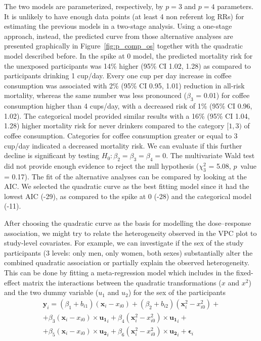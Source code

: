 \documentclass[11pt,a4paper,twoside,openany]{book}\usepackage{knitr}
\begin{document}
{{\noindent The two models are parameterized, respectively, by $p = 3$ and $p = 4$ parameters. It is unlikely to have enough data points (at least 4 non referent log RRs) for estimating the previous models in a two-stage analysis. Using a one-stage approach, instead, the predicted curve from those alternative analyses are presented graphically in Figure~\ref{fig:p_comp_os} together with the quadratic model described before. 
In the spike at 0 model, the predicted mortality risk for the unexposed participants was 14\% higher (95\% CI 1.02, 1.28) as compared to participants drinking 1 cup/day. Every one cup per day increase in coffee consumption was associated with 2\% (95\% CI 0.95, 1.01) reduction in all-risk mortality, whereas the same number was less pronounced ($\beta_3$ = 0.01) for coffee consumption higher than 4 cups/day, with a decreased risk of 1\% (95\% CI 0.96, 1.02). 
The categorical model provided similar results with a 16\% (95\% CI 1.04, 1.28) higher mortality risk for never drinkers compared to the category $[1, 3)$ of coffee consumption. Categories for coffee consumption greater or equal to 3 cup/day indicated a decreased mortality risk. We can evaluate if this further decline is significant by testing $H_0: \beta_2 = \beta_3 = \beta_4 = 0$. The multivariate Wald test did not provide enough evidence to reject the null hypothesis ($\chi_3^2$ = 5.08, $p$~value = 0.17).
The fit of the alternative analyses can be compared by looking at the AIC. We selected the quadratic curve as the best fitting model since it had the lowest AIC (-29), as compared to the spike at 0 (-28) and the categorical model (-11).



After choosing the quadratic curve as the basis for modelling the dose--response association, we might try to relate the heterogeneity observed in the VPC plot to study-level covariates. For example, we can investigate if the sex of the study participants (3 levels: only men, only women, both sexes) substantially alter the combined quadratic association or partially explain the observed heterogeneity. This can be done by fitting a meta-regression model which includes in the fixed-effect matrix the interactions between the quadratic transformations ($x$ and $x^2$) and the two dummy variable ($u_1$ and $u_2$) for the sex of the participants
\begin{multline*}
\mathbf{y}_i = (\beta_1 + b_{i1}) (\mathbf{x}_{i} - {x}_{i0}) + (\beta_2  + b_{i2}) (\mathbf{x}_{i}^2 - {x}_{i0}^2) +  \\
+ \beta_3 (\mathbf{x}_{i} - {x}_{i0}) \times \mathbf{u_1}_{i} + \beta_4 (\mathbf{x}_{i}^2 - {x}_{i0}^2)\times \mathbf{u_1}_{i}  + \\ 
 + \beta_5 (\mathbf{x}_{i} - {x}_{i0}) \times \mathbf{u_2}_{i} + \beta_6 (\mathbf{x}_{i}^2 - {x}_{i0}^2)\times \mathbf{u_2}_{i}  + 
\boldsymbol{\epsilon}_{i}
\end{multline*}

}}
\end{document}
